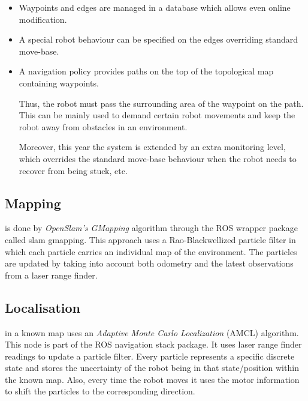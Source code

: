 \begin{itemize}
\item Waypoints and edges are managed in a database which allows even online modification.  
\item A special robot behaviour can be specified on the edges overriding standard move-base.
\item A navigation policy \cite{bruno} provides paths on the top of the topological map containing waypoints. 

Thus, the robot must pass the surrounding area of the waypoint on the path. This can be mainly used to demand certain robot movements and keep the robot away from obstacles in an environment.

 
Moreover, this year the system is extended by an extra monitoring level, which overrides the standard move-base behaviour when the robot needs to recover from being stuck, etc. 

\end{itemize}

\subsection{Mapping} is done by \textit{OpenSlam's GMapping} algorithm \cite{slam} through the ROS wrapper package called \textsf{slam gmapping}. This approach uses a Rao-Blackwellized particle filter in which each particle carries an individual map of the environment. The particles are updated by taking into account both odometry and the latest observations from a laser range finder.

\subsection{Localisation} in a known map uses an \textit{Adaptive Monte Carlo Localization} (AMCL)\cite{amcl} algorithm. This node is part of the ROS \textsf{navigation stack} package. It uses laser range finder readings to update a particle filter. Every particle represents a specific discrete state and stores the uncertainty of the robot being in that state/position within the known map. Also, every time the robot moves it uses the motor information to shift the particles to the corresponding direction.

